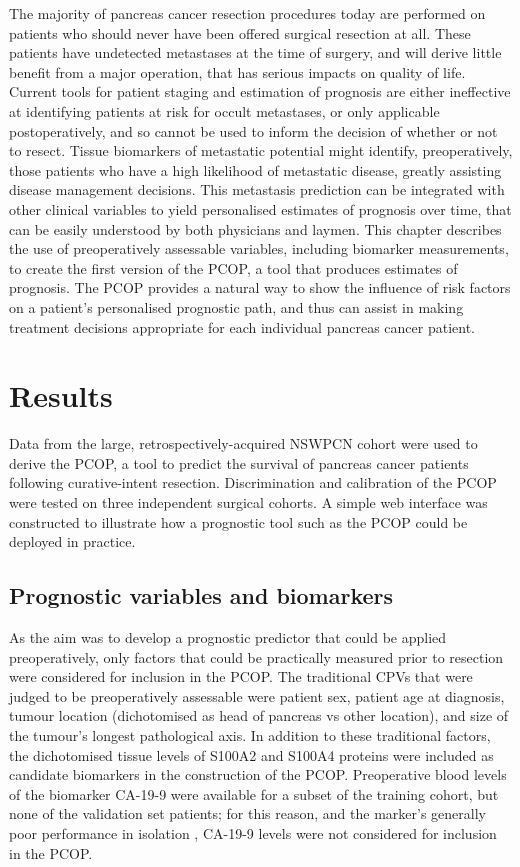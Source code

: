 \documentclass[dissertation.tex]{subfiles}
\begin{document}
The majority of pancreas cancer resection procedures today are performed on patients who should never have been offered surgical resection at all.  These patients have undetected metastases at the time of surgery, and will derive little benefit from a major operation, that has serious impacts on quality of life.  Current tools for patient staging and estimation of prognosis are either ineffective at identifying patients at risk for occult metastases, or only applicable postoperatively, and so cannot be used to inform the decision of whether or not to resect.  Tissue biomarkers of metastatic potential might identify, preoperatively, those patients who have a high likelihood of metastatic disease, greatly assisting disease management decisions.  This metastasis prediction can be integrated with other clinical variables to yield personalised estimates of prognosis over time, that can be easily understood by both physicians and laymen.  This chapter describes the use of preoperatively assessable variables, including biomarker measurements, to create the first version of the \gls{PCOP}, a tool that produces estimates of prognosis.  The \gls{PCOP} provides a natural way to show the influence of risk factors on a patient's personalised prognostic path, and thus can assist in making treatment decisions appropriate for each individual pancreas cancer patient.


\section{Results}
Data from the large, retrospectively-acquired \gls{NSWPCN} cohort were used to derive the \gls{PCOP}, a tool to predict the survival of pancreas cancer patients following curative-intent resection.  Discrimination and calibration of the \gls{PCOP} were tested on three independent surgical cohorts.  A simple web interface was constructed to illustrate how a prognostic tool such as the \gls{PCOP} could be deployed in practice.

\subsection{Prognostic variables and biomarkers}
As the aim was to develop a prognostic predictor that could be applied preoperatively, only factors that could be practically measured prior to resection were considered for inclusion in the \gls{PCOP}.  The traditional \glspl{CPV} that were judged to be preoperatively assessable were patient sex, patient age at diagnosis, tumour location (dichotomised as head of pancreas vs other location), and size of the tumour's longest pathological axis.  In addition to these traditional factors, the dichotomised tissue levels of S100A2 and S100A4 proteins were included as candidate biomarkers in the construction of the \gls{PCOP}.  Preoperative blood levels of the biomarker \gls{CA-19-9} were available for a subset of the training cohort, but none of the validation set patients; for this reason, and the marker's generally poor performance in isolation \cite{Kim2011}, \gls{CA-19-9} levels were not considered for inclusion in the \gls{PCOP}.
\end{document}

